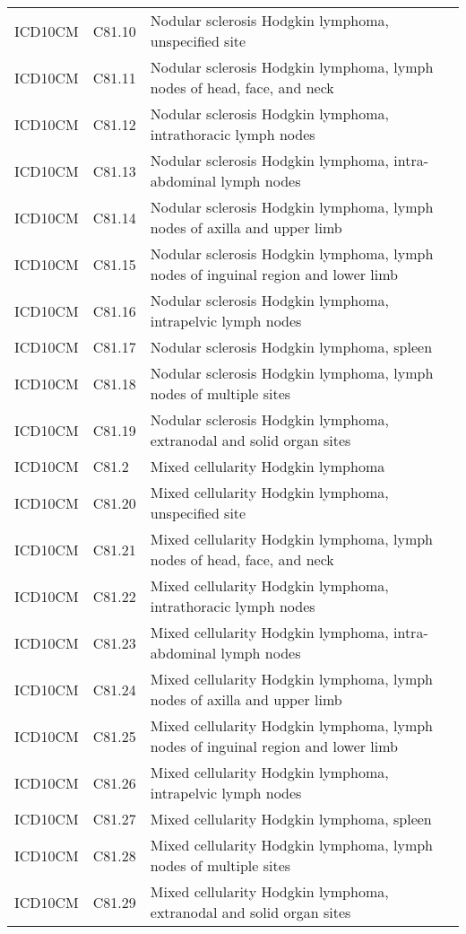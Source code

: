\begin{longtable}{p{}p{}p{}}
  ICD10CM & C81.10 & Nodular sclerosis Hodgkin lymphoma, unspecified site \\ 
  ICD10CM & C81.11 & Nodular sclerosis Hodgkin lymphoma, lymph nodes of head, face, and neck \\ 
  ICD10CM & C81.12 & Nodular sclerosis Hodgkin lymphoma, intrathoracic lymph nodes \\ 
  ICD10CM & C81.13 & Nodular sclerosis Hodgkin lymphoma, intra-abdominal lymph nodes \\ 
  ICD10CM & C81.14 & Nodular sclerosis Hodgkin lymphoma, lymph nodes of axilla and upper limb \\ 
  ICD10CM & C81.15 & Nodular sclerosis Hodgkin lymphoma, lymph nodes of inguinal region and lower limb \\ 
  ICD10CM & C81.16 & Nodular sclerosis Hodgkin lymphoma, intrapelvic lymph nodes \\ 
  ICD10CM & C81.17 & Nodular sclerosis Hodgkin lymphoma, spleen \\ 
  ICD10CM & C81.18 & Nodular sclerosis Hodgkin lymphoma, lymph nodes of multiple sites \\ 
  ICD10CM & C81.19 & Nodular sclerosis Hodgkin lymphoma, extranodal and solid organ sites \\ 
  ICD10CM & C81.2 & Mixed cellularity Hodgkin lymphoma \\ 
  ICD10CM & C81.20 & Mixed cellularity Hodgkin lymphoma, unspecified site \\ 
  ICD10CM & C81.21 & Mixed cellularity Hodgkin lymphoma, lymph nodes of head, face, and neck \\ 
  ICD10CM & C81.22 & Mixed cellularity Hodgkin lymphoma, intrathoracic lymph nodes \\ 
  ICD10CM & C81.23 & Mixed cellularity Hodgkin lymphoma, intra-abdominal lymph nodes \\ 
  ICD10CM & C81.24 & Mixed cellularity Hodgkin lymphoma, lymph nodes of axilla and upper limb \\ 
  ICD10CM & C81.25 & Mixed cellularity Hodgkin lymphoma, lymph nodes of inguinal region and lower limb \\ 
  ICD10CM & C81.26 & Mixed cellularity Hodgkin lymphoma, intrapelvic lymph nodes \\ 
  ICD10CM & C81.27 & Mixed cellularity Hodgkin lymphoma, spleen \\ 
  ICD10CM & C81.28 & Mixed cellularity Hodgkin lymphoma, lymph nodes of multiple sites \\ 
  ICD10CM & C81.29 & Mixed cellularity Hodgkin lymphoma, extranodal and solid organ sites \\ 

\end{longtable}
